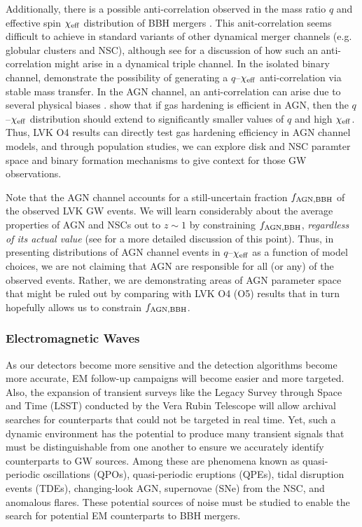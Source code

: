 Additionally, there is a possible anti-correlation observed in the mass ratio $q$ and effective spin $\chi_{\rm eff}$ distribution of BBH mergers \citep{Callister+21}.
This anit-correlation seems difficult to achieve in standard variants of other dynamical merger channels (e.g. globular clusters and NSC), although see \citet{Su25} for a discussion of how such an anti-correlation might arise in a dynamical triple channel.
In the isolated binary channel, \citet{Olejak+24,BanerjeeOlejak24} demonstrate the possibility of generating a $q$--$\chi_{\rm eff}$ anti-correlation via stable mass transfer.
In the AGN channel, an anti-correlation can arise due to several physical biases \citep{McKernan+22:q-Xeff,Santini+23, DittmannDempseyLi24}.
\citet{Vaccaro+24} show that if gas hardening is efficient in AGN, then the $q$--$\chi_{\rm eff}$ distribution should extend to significantly smaller values of $q$ and high $\chi_{\rm eff}$.
Thus, LVK O4 results can directly test gas hardening efficiency in AGN channel models, and through population studies, we can explore disk and NSC paramter space and binary formation mechanisms to give context for those GW observations.

Note that the AGN channel accounts for a still-uncertain fraction $f_{\rm AGN,BBH}$ of the observed LVK GW events.
We will learn considerably about the average properties of AGN and NSCs out to $z \sim 1$ by constraining $f_{\rm AGN, BBH}$, \emph{regardless of its actual value} (see \citealt{FordMcKernan25} for a more detailed discussion of this point).
Thus, in presenting distributions of AGN channel events in $q$--$\chi_{\rm eff}$ as a function of model choices, we are not claiming that AGN are responsible for all (or any) of the observed events.
Rather, we are demonstrating areas of AGN parameter space that might be ruled out by comparing with LVK O4 (O5) results that in turn hopefully allows us to constrain $f_{\rm AGN,BBH}$.




\subsubsection{Electromagnetic Waves}

As our detectors become more sensitive and the detection algorithms become more accurate, EM follow-up campaigns will become easier and more targeted.
Also, the expansion of transient surveys like the Legacy Survey through Space and Time (LSST) conducted by the Vera Rubin Telescope will allow archival searches for counterparts that could not be targeted in real time.
Yet, such a dynamic environment has the potential to produce many transient signals that must be distinguishable from one another to ensure we accurately identify counterparts to GW sources.
Among these are phenomena known as quasi-periodic oscillations (QPOs), quasi-periodic eruptions (QPEs), tidal disruption events (TDEs), changing-look AGN, supernovae (SNe) from the NSC, and anomalous flares.
These potential sources of noise must be studied to enable the search for potential EM counterparts to BBH mergers.

